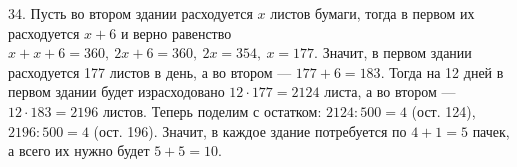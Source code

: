 34. Пусть во втором здании расходуется $x$ листов бумаги, тогда в первом их расходуется $x+6$ и верно равенство $x+x+6=360,\ 2x+6=360,\ 2x=354,\ x=177.$ Значит, в первом здании расходуется 177 листов в день, а во втором --- $177+6=183.$ Тогда на 12 дней в первом здании будет израсходовано $12\cdot177=2124$ листа, а во втором --- $12\cdot183=2196$ листов. Теперь поделим с остатком: $2124:500=4$ (ост. 124), $2196:500=4$ (ост. 196). Значит, в каждое здание потребуется по $4+1=5$ пачек, а всего их нужно будет $5+5=10.$\\
